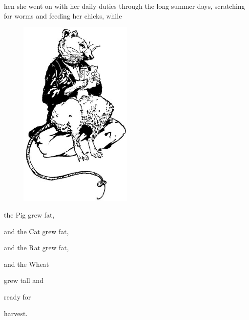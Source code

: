 \documentclass[letterpaper, 10pt, openany]{memoir}
\begin{document}
hen she went on with her daily duties through the long summer days, scratching for worms and
feeding her chicks, while

\begin{figure}
	\vspace{-2\onelineskip}
	\includegraphics[width=0.5\textwidth]{image_016_3.jpg}
\end{figure}

\vspace{\onelineskip}

the Pig grew fat,

\vspace{\onelineskip}

and the Cat grew fat,

\vspace{\onelineskip}

and the Rat grew fat,

\vspace{\onelineskip}

and the Wheat

\vspace{\onelineskip}

grew tall and

\vspace{\onelineskip}

ready for

\vspace{\onelineskip}

harvest.
\end{document}
